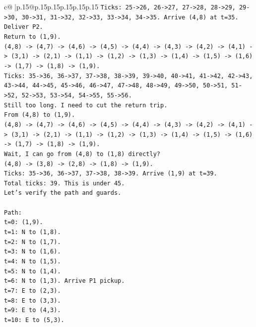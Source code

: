 \documentclass{article}
\begin{document}
{\begin{supertabular}{c@{$\;$}|p{.15\linewidth}@{}p{.15\linewidth}p{.15\linewidth}p{.15\linewidth}p{.15\linewidth}p{.15\linewidth}}
{{{\texttt{Ticks: 25{-}>26, 26{-}>27, 27{-}>28, 28{-}>29, 29{-}>30, 30{-}>31, 31{-}>32, 32{-}>33, 33{-}>34, 34{-}>35. Arrive (4,8) at t=35.} \\
\texttt{Deliver P2.} \\
\texttt{Return to (1,9).} \\
\texttt{(4,8) {-}> (4,7) {-}> (4,6) {-}> (4,5) {-}> (4,4) {-}> (4,3) {-}> (4,2) {-}> (4,1) {-}> (3,1) {-}> (2,1) {-}> (1,1) {-}> (1,2) {-}> (1,3) {-}> (1,4) {-}> (1,5) {-}> (1,6) {-}> (1,7) {-}> (1,8) {-}> (1,9).} \\
\texttt{Ticks: 35{-}>36, 36{-}>37, 37{-}>38, 38{-}>39, 39{-}>40, 40{-}>41, 41{-}>42, 42{-}>43, 43{-}>44, 44{-}>45, 45{-}>46, 46{-}>47, 47{-}>48, 48{-}>49, 49{-}>50, 50{-}>51, 51{-}>52, 52{-}>53, 53{-}>54, 54{-}>55, 55{-}>56.} \\
\texttt{Still too long. I need to cut the return trip.} \\
\texttt{From (4,8) to (1,9).} \\
\texttt{(4,8) {-}> (4,7) {-}> (4,6) {-}> (4,5) {-}> (4,4) {-}> (4,3) {-}> (4,2) {-}> (4,1) {-}> (3,1) {-}> (2,1) {-}> (1,1) {-}> (1,2) {-}> (1,3) {-}> (1,4) {-}> (1,5) {-}> (1,6) {-}> (1,7) {-}> (1,8) {-}> (1,9).} \\
\texttt{Wait, I can go from (4,8) to (1,8) directly?} \\
\texttt{(4,8) {-}> (3,8) {-}> (2,8) {-}> (1,8) {-}> (1,9).} \\
\texttt{Ticks: 35{-}>36, 36{-}>37, 37{-}>38, 38{-}>39. Arrive (1,9) at t=39.} \\
\texttt{Total ticks: 39. This is under 45.} \\
\texttt{Let's verify the path and guards.} \\
\\ 
\texttt{Path:} \\
\texttt{t=0: (1,9).} \\
\texttt{t=1: N to (1,8).} \\
\texttt{t=2: N to (1,7).} \\
\texttt{t=3: N to (1,6).} \\
\texttt{t=4: N to (1,5).} \\
\texttt{t=5: N to (1,4).} \\
\texttt{t=6: N to (1,3). Arrive P1 pickup.} \\
\texttt{t=7: E to (2,3).} \\
\texttt{t=8: E to (3,3).} \\
\texttt{t=9: E to (4,3).} \\
\texttt{t=10: E to (5,3).} \\
}}}
\end{supertabular}}
\end{document}
